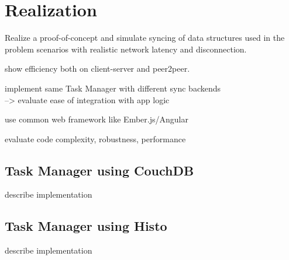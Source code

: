 
\chapter{Realization}
\label{sec:realization}

Realize a proof-of-concept and simulate syncing of data structures
used in the problem scenarios with realistic network latency and
disconnection.

show efficiency both on client-server and peer2peer.

implement same Task Manager with different sync backends\\
--> evaluate ease of integration with app logic

use common web framework like Ember.js/Angular

evaluate code complexity, robustness, performance

\section{Task Manager using CouchDB}

describe implementation

\section{Task Manager using Histo}

describe implementation
